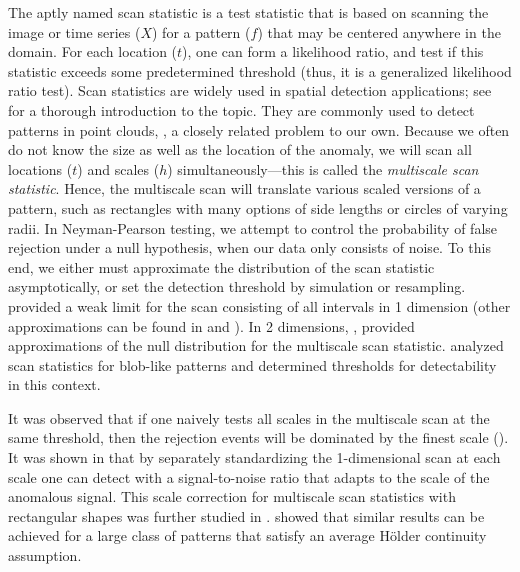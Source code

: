 The aptly named scan statistic is a test statistic that is based on scanning the image or time series ($X$) for a pattern ($f$) that may be centered anywhere in the domain.
For each location ($t$), one can form a likelihood ratio, and test if this statistic exceeds some predetermined threshold (thus, it is a generalized likelihood ratio test).
Scan statistics are widely used in spatial detection applications; see \cite{glaz2001scan} for a thorough introduction to the topic.
They are commonly used to detect patterns in point clouds, \cite{Naus65, neill2012fast}, a closely related problem to our own.
Because we often do not know the size as well as the location of the anomaly, we will scan all locations ($t$) and scales ($h$) simultaneously---this is called the {\em multiscale scan statistic}. 
Hence, the multiscale scan will translate various scaled versions of a pattern, such as rectangles with many options of side lengths or circles of varying radii.
In Neyman-Pearson testing, we attempt to control the probability of false rejection under a null hypothesis, when our data only consists of noise.
To this end, we either must approximate the distribution of the scan statistic asymptotically, or set the detection threshold by simulation or resampling.  
\cite{siegmund1995testing} provided a weak limit for the scan consisting of all intervals in 1 dimension (other approximations can be found in \cite{naus2004multiple} and \cite{pozdnyakov2005martingale}).
In 2 dimensions, \cite{glaz2004multiple, haiman2006estimation, wang2014variable, kabluchko2011extremes}, provided approximations of the null distribution for the multiscale scan statistic.
\cite{MGD, cluster} analyzed scan statistics for blob-like patterns and determined thresholds for detectability in this context. 

It was observed that if one naively tests all scales in the multiscale scan at the same threshold, then the rejection events will be dominated by the finest scale (\cite{chan2013detection}).
It was shown in \cite{dumbgen2001multiscale} that by separately standardizing the 1-dimensional scan at each scale one can detect with a signal-to-noise ratio that adapts to the scale of the anomalous signal.
This scale correction for multiscale scan statistics with rectangular shapes was further studied in \cite{MR2604703, sharpnack2016exact}.
\cite{proksch2016multiscale} showed that similar results can be achieved for a large class of patterns that satisfy an average H\"older continuity assumption.


